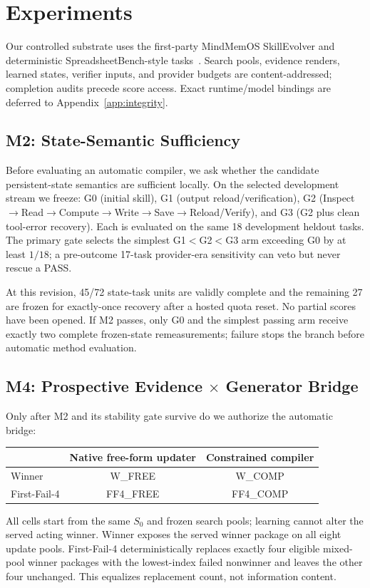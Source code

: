 \section{Experiments}
\label{sec:experiments}

Our controlled substrate uses the first-party MindMemOS SkillEvolver and deterministic SpreadsheetBench-style tasks~\citep{liang2026mindmemos}. Search pools, evidence renders, learned states, verifier inputs, and provider budgets are content-addressed; completion audits precede score access. Exact runtime/model bindings are deferred to Appendix~\ref{app:integrity}.

\subsection{M2: State-Semantic Sufficiency}

Before evaluating an automatic compiler, we ask whether the candidate persistent-state semantics are sufficient locally. On the selected development stream we freeze: G0 (initial skill), G1 (output reload/verification), G2 (Inspect$\rightarrow$Read$\rightarrow$Compute$\rightarrow$Write$\rightarrow$Save$\rightarrow$Reload/Verify), and G3 (G2 plus clean tool-error recovery). Each is evaluated on the same 18 development heldout tasks. The primary gate selects the simplest G1$<$G2$<$G3 arm exceeding G0 by at least $1/18$; a pre-outcome 17-task provider-era sensitivity can veto but never rescue a PASS.

At this revision, 45/72 state-task units are validly complete and the remaining 27 are frozen for exactly-once recovery after a hosted quota reset. No partial scores have been opened. If M2 passes, only G0 and the simplest passing arm receive exactly two complete frozen-state remeasurements; failure stops the branch before automatic method evaluation.

\subsection{M4: Prospective \texorpdfstring{Evidence $\times$ Generator}{Evidence x Generator} Bridge}

Only after M2 and its stability gate survive do we authorize the automatic bridge:
\begin{center}
\small
\begin{tabular}{lcc}
\toprule
 & Native free-form updater & Constrained compiler \\
\midrule
Winner & W\_FREE & W\_COMP \\
First-Fail-4 & FF4\_FREE & FF4\_COMP \\
\bottomrule
\end{tabular}
\end{center}
All cells start from the same $S_0$ and frozen search pools; learning cannot alter the served acting winner. Winner exposes the served winner package on all eight update pools. First-Fail-4 deterministically replaces exactly four eligible mixed-pool winner packages with the lowest-index failed nonwinner and leaves the other four unchanged. This equalizes replacement count, not information content.

